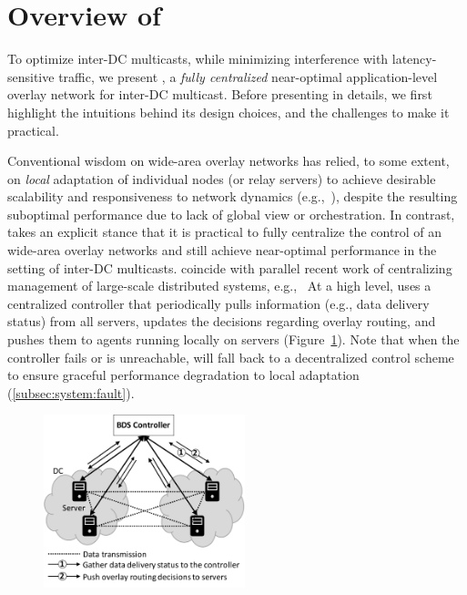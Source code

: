 \section{Overview of \name}
\label{sec:overview}

To optimize inter-DC multicasts, while minimizing interference with 
latency-sensitive traffic, we present {\em \name}, a {\em fully centralized} 
near-optimal application-level overlay network for inter-DC multicast. 
Before presenting \name in details, we first highlight the intuitions 
behind its design choices, and the challenges to make it practical.


Conventional wisdom on wide-area overlay networks has relied, to 
some extent, on {\em local} adaptation of individual nodes (or 
relay servers) to achieve desirable scalability and responsiveness 
to network dynamics 
(e.g.,~\cite{Andreev2013Designing,Repantis2010Scaling,Huang2014A,mukerjee2014enabling}),
despite the resulting suboptimal performance due to lack of global 
view or orchestration. 
In contrast, \name takes an explicit stance that it is practical to 
fully centralize the control of an wide-area overlay networks and 
still achieve near-optimal performance in the setting of inter-DC 
multicasts. \name coincide with parallel recent work of centralizing
management of large-scale distributed systems, e.g.,~\cite{gog2016firmament}
At a high level, \name uses a centralized controller that 
periodically pulls information (e.g., data delivery status) from all 
servers, updates the decisions regarding overlay routing, and pushes 
them to agents running locally on servers 
(Figure~\ref{fig:framework}).
Note that when the controller fails or is unreachable, \name will 
fall back to a decentralized control scheme to ensure graceful 
performance degradation to local adaptation 
(\Section\ref{subsec:system:fault}).

\begin{figure}[t]
  \centering
  \includegraphics[width=2.3in]{images/framework-new.pdf}
    \vspace{-0.2cm}
  \label{fig:framework}
\vspace{-0.4cm}
\end{figure}


